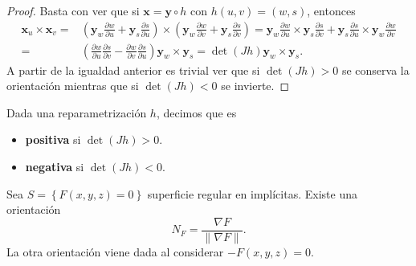 \begin{proof}
Basta con ver que si $\displaystyle \textbf{x}  = \textbf{y} \circ h $ con $\displaystyle h\left(u,v\right)=\left(w,s\right) $, entonces 
\[
\begin{split}
	\textbf{x} _{u} \times \textbf{x} _{v} = & \left( \textbf{y} _{w}\frac{\partial w}{\partial u} + \textbf{y} _{s}\frac{\partial s}{\partial u}\right) \times \left( \textbf{y} _{w}\frac{\partial w}{\partial v} + \textbf{y} _{s} \frac{\partial s}{\partial v}\right)
	= \textbf{y} _{w}\frac{\partial w}{\partial u} \times \textbf{y} _{s}\frac{\partial s}{\partial v} + \textbf{y} _{s}\frac{\partial s}{\partial u} \times \textbf{y} _{w}\frac{\partial w}{\partial v} \\
	= &  \left(\frac{\partial w}{\partial u}  \frac{\partial s}{\partial v}-\frac{\partial w}{\partial v}  \frac{\partial s}{\partial u}\right) \textbf{y} _{w} \times \textbf{y} _{s}  = \det\left(Jh\right) \textbf{y} _{w} \times \textbf{y} _{ s}.
\end{split}
\]
A partir de la igualdad anterior es trivial ver que si $\displaystyle \det\left(Jh\right) > 0$ se conserva la orientación mientras que si $\displaystyle \det\left(Jh\right)<0 $ se invierte. 
\end{proof}

\begin{definition}
Dada una reparametrización $\displaystyle h $, decimos que es
\begin{itemize}
\item \textbf{positiva} si $\displaystyle \det\left(Jh\right)>0 $. 
\item \textbf{negativa} si $\displaystyle \det\left(Jh\right)<0 $. 
\end{itemize}
\end{definition}
\begin{observation}
	Sea $\displaystyle S = \left\{ F\left(x,y,z\right)=0\right\}  $ superficie regular en implícitas. Existe una orientación
	\[N_{F}=\frac{\nabla F}{\|\nabla F\|} .\]
	La otra orientación viene dada al considerar $\displaystyle -F\left(x,y,z\right)=0 $.
\end{observation}

